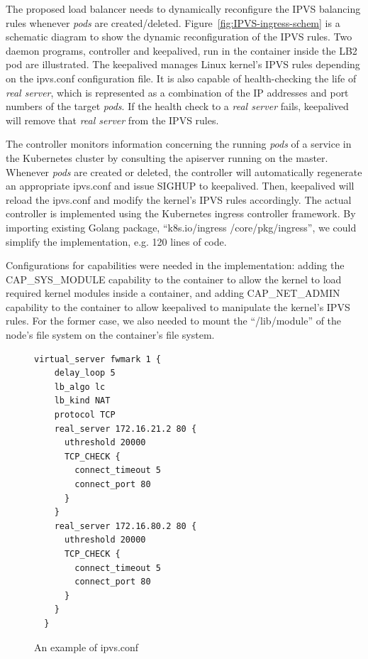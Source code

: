 The proposed load balancer needs to dynamically reconfigure the IPVS balancing rules whenever {\em pods} are created/deleted. 
Figure~\ref{fig:IPVS-ingress-schem} is a schematic diagram to show the dynamic reconfiguration of the IPVS rules.
Two daemon programs, controller and keepalived, run in the container inside the LB2 pod are illustrated.
The keepalived manages Linux kernel's IPVS rules depending on the ipvs.conf configuration file.
It is also capable of health-checking the life of {\em real server}, 
which is represented as a combination of the IP addresses and port numbers of the target {\em pods}. 
If the health check to a {\em real server} fails, keepalived will remove that {\em real server} from the IPVS rules.

The controller monitors information concerning the running {\em pods} of a service 
in the Kubernetes cluster by consulting the apiserver running on the master.
Whenever {\em pods} are created or deleted, the controller will automatically regenerate an appropriate ipvs.conf 
and issue SIGHUP to keepalived.
Then, keepalived will reload the ipvs.conf and modify the kernel's IPVS rules accordingly.
The actual controller\cite{ktaka_ccmp_2017_826894} is implemented using the Kubernetes ingress controller\cite{K8sIngress2017} framework. 
By importing existing Golang package, \enquote{k8s.io/ingress /core/pkg/ingress}, we could simplify the implementation, e.g. 
120 lines of code.  

Configurations for capabilities were needed in the implementation: adding the CAP\_SYS\_MODULE capability 
to the container to allow the kernel to load required kernel modules inside a container, 
and adding CAP\_NET\_ADMIN capability to the container to allow keepalived to manipulate the kernel's IPVS rules. 
For the former case, we also needed to mount the \enquote{/lib/module} of the node's file system on the container's file system.

\begin{figure}
  \centering
\begin{minipage}{0.7\columnwidth}
\begin{lstlisting}[frame=single]
  virtual_server fwmark 1 {
    delay_loop 5
    lb_algo lc
    lb_kind NAT
    protocol TCP
    real_server 172.16.21.2 80 {
      uthreshold 20000
      TCP_CHECK {
        connect_timeout 5
        connect_port 80
      }
    }
    real_server 172.16.80.2 80 {
      uthreshold 20000
      TCP_CHECK {
        connect_timeout 5
        connect_port 80
      }
    }
  }
\end{lstlisting}
\end{minipage}
\caption{An example of ipvs.conf}
\label{fig:ipvs.conf}
\end{figure}

